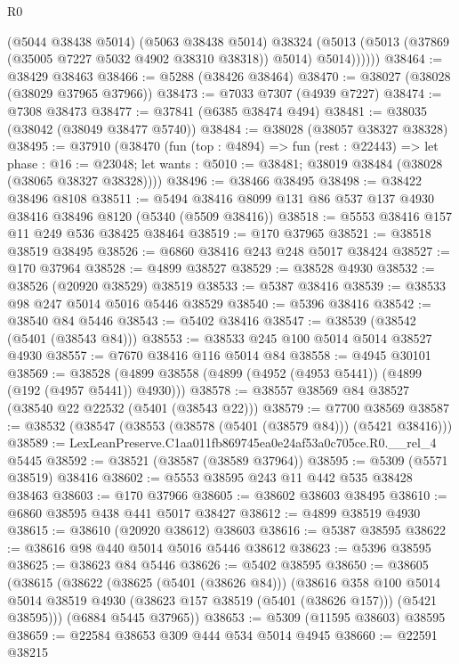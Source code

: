 \begin{lexlean}{R0}
\begin{coremodule}
              (@5044 @38438 @5014)
              (@5063 @38438 @5014)
              @38324
              (@5013 (@5013 (@37869 (@35005 @7227 @5032 @4902 @38310 @38318)) @5014) @5014))))))
@38464 := @38429 @38463
@38466 := @5288 (@38426 @38464)
@38470 := @38027 (@38028 (@38029 @37965 @37966))
@38473 := @7033 @7307 (@4939 @7227)
@38474 := @7308 @38473
@38477 := @37841 (@6385 @38474 @494)
@38481 := @38035 (@38042 (@38049 @38477 @5740))
@38484 := @38028 (@38057 @38327 @38328)
@38495 := @37910
    (@38470
      (fun (top : @4894) =>
      fun (rest : @22443) =>
      let phase : @16 := @23048;
      let wants : @5010 := @38481; @38019 @38484 (@38028 (@38065 @38327 @38328))))
@38496 := @38466 @38495
@38498 := @38422 @38496 @8108
@38511 := @5494 @38416 @8099 @131 @86 @537 @137 @4930 @38416 @38496 @8120 (@5340 (@5509 @38416))
@38518 := @5553 @38416 @157 @11 @249 @536 @38425 @38464
@38519 := @170 @37965
@38521 := @38518 @38519 @38495
@38526 := @6860 @38416 @243 @248 @5017 @38424
@38527 := @170 @37964
@38528 := @4899 @38527
@38529 := @38528 @4930
@38532 := @38526 (@20920 @38529) @38519
@38533 := @5387 @38416
@38539 := @38533 @98 @247 @5014 @5016 @5446 @38529
@38540 := @5396 @38416
@38542 := @38540 @84 @5446
@38543 := @5402 @38416
@38547 := @38539 (@38542 (@5401 (@38543 @84)))
@38553 := @38533 @245 @100 @5014 @5014 @38527 @4930
@38557 := @7670 @38416 @116 @5014 @84
@38558 := @4945 @30101
@38569 := @38528 (@4899 @38558 (@4899 (@4952 (@4953 @5441)) (@4899 (@192 (@4957 @5441)) @4930)))
@38578 := @38557 @38569 @84 @38527 (@38540 @22 @22532 (@5401 (@38543 @22)))
@38579 := @7700 @38569
@38587 := @38532 (@38547 (@38553 (@38578 (@5401 (@38579 @84))) (@5421 @38416)))
@38589 := LexLeanPreserve.C1aa011fb869745ea0e24af53a0c705ce.R0.__rel_4 @5445
@38592 := @38521 (@38587 (@38589 @37964))
@38595 := @5309 (@5571 @38519) @38416
@38602 := @5553 @38595 @243 @11 @442 @535 @38428 @38463
@38603 := @170 @37966
@38605 := @38602 @38603 @38495
@38610 := @6860 @38595 @438 @441 @5017 @38427
@38612 := @4899 @38519 @4930
@38615 := @38610 (@20920 @38612) @38603
@38616 := @5387 @38595
@38622 := @38616 @98 @440 @5014 @5016 @5446 @38612
@38623 := @5396 @38595
@38625 := @38623 @84 @5446
@38626 := @5402 @38595
@38650 := @38605
    (@38615
      (@38622
        (@38625 (@5401 (@38626 @84)))
        (@38616
          @358
          @100
          @5014
          @5014
          @38519
          @4930
          (@38623 @157 @38519 (@5401 (@38626 @157)))
          (@5421 @38595)))
      (@6884 @5445 @37965))
@38653 := @5309 (@11595 @38603) @38595
@38659 := @22584 @38653 @309 @444 @534 @5014 @4945
@38660 := @22591 @38215

\end{coremodule}
\end{lexlean}
